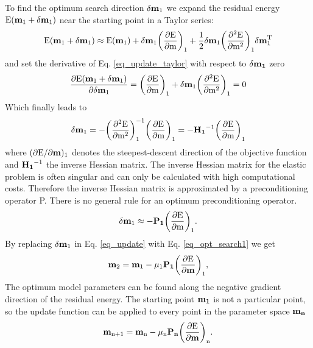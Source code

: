 To find the optimum search direction $\rm{\mathbf{\delta m}_{1}}$ we expand the residual energy $\rm{E(\mathbf{m}_{1} + \mathbf{\delta m}_{1})}$ near the starting point in a Taylor series:
\begin{equation}
\rm{E(\mathbf{m}_{1} + \mathbf{\delta m}_{1}) \approx E(\mathbf{m}_{1}) + \mathbf{\delta m}_{1} \biggl(\frac{\partial E}{\partial m}\biggr)_1 + \frac{1}{2} \mathbf{\delta m}_{1} \biggl(\frac{\partial^2 E}{\partial m^2}\biggr)_1 \mathbf{\delta m}_{1}^T}   
\label{eq_update_taylor}
\end{equation} 
and set the derivative of Eq. \ref{eq_update_taylor} with respect to $\rm{\delta \mathbf{m_1}}$ zero
\begin{equation}
\rm{\frac{\partial E(\mathbf{m}_{1} + \mathbf{\delta m}_{1})}{\partial \mathbf{\delta m}_{1}} = \biggl(\frac{\partial E}{\partial m}\biggr)_1 + \mathbf{\delta m}_{1} \biggl(\frac{\partial^2 E}{\partial m^2}\biggr)_1 = 0}   
\label{eq_update_taylor_prime}
\end{equation} 
Which finally leads to
\begin{equation}
\rm{\mathbf{\delta m}_{1} = - \biggl(\frac{\partial^2 E}{\partial m^2}\biggr)_1^{-1} \biggl(\frac{\partial E}{\partial m}\biggr)_1 = -  \mathbf{H_1}^{-1} \biggl(\frac{\partial E}{\partial m}\biggr)_1}   
\label{eq_opt_search}
\end{equation} 
where $\rm{(\partial E/\partial \mathbf{m})_1}$ denotes the steepest-descent direction of the objective function and $\rm{\mathbf{H_1}^{-1}}$ the inverse Hessian matrix. The inverse Hessian matrix for the elastic problem is often singular and can only be calculated with high computational costs. Therefore the inverse Hessian matrix is approximated by a preconditioning operator P. There is no general rule for an optimum preconditioning operator. 
\begin{equation}
\rm{\mathbf{\delta m}_{1} \approx - \mathbf{P_1} \biggl(\frac{\partial E}{\partial m}\biggr)_1.}   
\label{eq_opt_search1}
\end{equation} 
By replacing $\rm{\mathbf{\delta m}_{1}}$ in Eq. \ref{eq_update} with Eq. \ref{eq_opt_search1} we get         
\begin{equation} 
\rm{\mathbf{m}_{2} = \mathbf{m}_{1} - \mu_1 \mathbf{P_1} \biggl(\frac{\partial E}{\partial \mathbf{m}}\biggr)_1, }
\label{eq_update1}
\end{equation} 
The optimum model parameters can be found along the negative gradient direction of the residual energy. The starting point $\rm{\mathbf{m_1}}$ is not a particular point, so the update function can be applied to every point in the parameter space $\rm{\mathbf{m_n}}$ 
\begin{equation} 
\rm{\mathbf{m}_{n+1} = \mathbf{m}_{n} - \mu_n \mathbf{P_n} \biggl(\frac{\partial E}{\partial \mathbf{m}}\biggr)_n. }
\label{eq_updatefinal}
\end{equation} 

